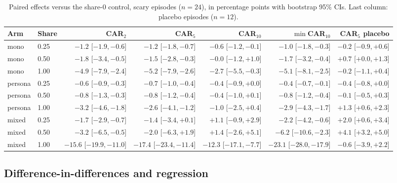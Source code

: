 \documentclass[10pt]{article}
\begin{document}
\begin{table}[t]
  \centering\small
  \caption{Paired effects versus the share-0 control, scary episodes ($n=24$), in percentage points with bootstrap 95\% CIs. Last column: placebo episodes ($n=12$).}
  \label{tab:paired}
  \setlength{\tabcolsep}{3pt}\scriptsize
  \begin{tabular}{llrrrrr}
    \toprule
    Arm & Share & CAR$_2$ & CAR$_5$ & CAR$_{10}$ & $\min$CAR$_{10}$ & CAR$_5$ placebo \\
    \midrule
    mono    & 0.25 & $-1.2$ [$-1.9,-0.6$] & $-1.2$ [$-1.8,-0.7$] & $-0.6$ [$-1.2,-0.1$] & $-1.0$ [$-1.8,-0.3$] & $-0.2$ [$-0.9,+0.6$] \\
    mono    & 0.50 & $-1.8$ [$-3.4,-0.5$] & $-1.5$ [$-2.8,-0.3$] & $-0.0$ [$-1.2,+1.0$] & $-1.7$ [$-3.2,-0.4$] & $+0.7$ [$+0.0,+1.3$] \\
    mono    & 1.00 & $-4.9$ [$-7.9,-2.4$] & $-5.2$ [$-7.9,-2.6$] & $-2.7$ [$-5.5,-0.3$] & $-5.1$ [$-8.1,-2.5$] & $-0.2$ [$-1.1,+0.4$] \\
    \addlinespace
    persona & 0.25 & $-0.6$ [$-0.9,-0.3$] & $-0.7$ [$-1.0,-0.4$] & $-0.4$ [$-0.9,+0.0$] & $-0.4$ [$-0.7,-0.1$] & $-0.4$ [$-0.8,+0.0$] \\
    persona & 0.50 & $-0.8$ [$-1.3,-0.3$] & $-0.8$ [$-1.2,-0.4$] & $-0.4$ [$-1.0,+0.1$] & $-0.8$ [$-1.2,-0.4$] & $-0.1$ [$-0.5,+0.3$] \\
    persona & 1.00 & $-3.2$ [$-4.6,-1.8$] & $-2.6$ [$-4.1,-1.2$] & $-1.0$ [$-2.5,+0.4$] & $-2.9$ [$-4.3,-1.7$] & $+1.3$ [$+0.6,+2.3$] \\
    \addlinespace
    mixed   & 0.25 & $-1.7$ [$-2.9,-0.7$] & $-1.4$ [$-3.4,+0.1$] & $+1.1$ [$-0.9,+2.9$] & $-2.2$ [$-4.2,-0.6$] & $+2.0$ [$+0.6,+3.4$] \\
    mixed   & 0.50 & $-3.2$ [$-6.5,-0.5$] & $-2.0$ [$-6.3,+1.9$] & $+1.4$ [$-2.6,+5.1$] & $-6.2$ [$-10.6,-2.3$] & $+4.1$ [$+3.2,+5.0$] \\
    mixed   & 1.00 & $-15.6$ [$-19.9,-11.0$] & $-17.4$ [$-23.4,-11.4$] & $-12.3$ [$-17.1,-7.7$] & $-23.1$ [$-28.0,-17.9$] & $-0.6$ [$-3.9,+2.2$] \\
    \bottomrule
  \end{tabular}
\end{table}

\subsection{Difference-in-differences and regression}
\end{document}
